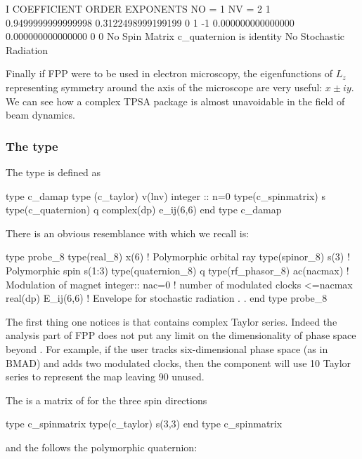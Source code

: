 \documentclass[english,12pt,article]{article} %
\begin{document}
{\begin{example}
    I  COEFFICIENT          ORDER   EXPONENTS
      NO =     1      NV =     2
   1  0.9499999999999998      0.3122498999199199       0  1
    -1   0.000000000000000       0.000000000000000       0  0
  No Spin Matrix
  c_quaternion is identity
 No Stochastic Radiation
\end{example}

Finally if FPP were to be used in electron microscopy, the eigenfunctions of $L_z$ representing symmetry around the axis of the microscope are very useful: $x \pm i y$. We can see how a complex TPSA package is almost unavoidable in the field of beam dynamics.
  
\newpage
  \subsubsection{The type {} }\label{sec:c_damap}
  
  The type   is defined as
  
  \begin{example}
 type c_damap
   type (c_taylor) v(lnv)  
   integer :: n=0 
   type(c_spinmatrix) s 
   type(c_quaternion) q
   complex(dp) e_ij(6,6) 
 end type c_damap
  \end{example}

There is an obvious resemblance  with  which we recall is:
  \begin{example}
    type probe_8
     type(real_8) x(6)     ! Polymorphic orbital ray
     type(spinor_8) s(3)   ! Polymorphic spin s(1:3)
     type(quaternion_8) q 
     type(rf_phasor_8)  ac(nacmax)  ! Modulation of magnet
     integer:: nac=0 !  number of modulated clocks <=nacmax
     real(dp) E_ij(6,6)   !  Envelope for stochastic radiation
           .
           .
  end type probe_8
    \end{example}

The first thing one notices is that   contains  complex Taylor series. Indeed the analysis part of FPP does not put any limit on the dimensionality of phase space beyond . For example, if the user tracks six-dimensional phase space (as in BMAD) and adds two modulated clocks, then the component    will use 10 Taylor series to represent the map leaving 90 unused. 


The  is a matrix of   for the three spin directions
  \begin{example}
  type c_spinmatrix
     type(c_taylor) s(3,3)
  end type c_spinmatrix
      \end{example}
and the  follows the polymorphic quaternion:

}
\end{document}
